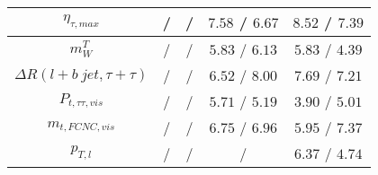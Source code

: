 \begin{table}
\begin{tabular}{|c|c|c|c|c|}
$\eta_{\tau ,max}$ &  / &  / & $7.58$ / $6.67$ & $8.52$ / $7.39$\\\hline
$m^{T}_{W}$ &  / &  / & $5.83$ / $6.13$ & $5.83$ / $4.39$\\\hline
$\Delta R(l+b~jet,\tau +\tau )$ &  / &  / & $6.52$ / $8.00$ & $7.69$ / $7.21$\\\hline
$P_{t,\tau \tau ,vis}$ &  / &  / & $5.71$ / $5.19$ & $3.90$ / $5.01$\\\hline
$m_{t,FCNC,vis}$ &  / &  / & $6.75$ / $6.96$ & $5.95$ / $7.37$\\\hline
$p_{T,l}$ &  / &  / &  / & $6.37$ / $4.74$\\\hline
\end{tabular}
\label{tab:importance}
\end{table}
